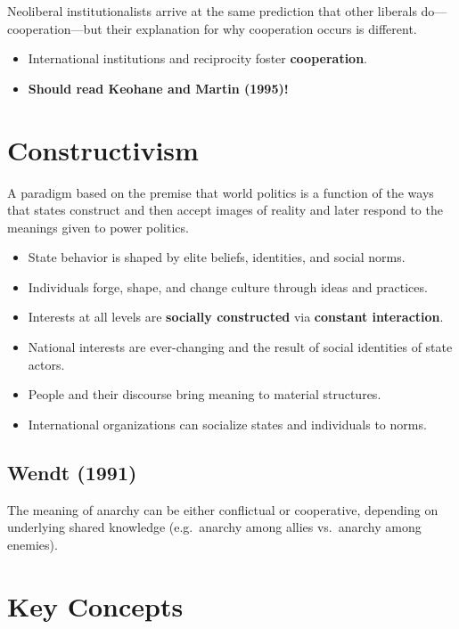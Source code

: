 \documentclass[
]{book}
\begin{document}
Neoliberal institutionalists arrive at the same prediction that other liberals do---cooperation---but their explanation for why cooperation occurs is different.

\begin{itemize}
\item
  International institutions and reciprocity foster \textbf{cooperation}.
\item
  \textbf{Should read Keohane and Martin (1995)!}
\end{itemize}

\hypertarget{constructivism}{%
\section{Constructivism}\label{constructivism}}

A paradigm based on the premise that world politics is a function of the ways that states construct and then accept images of reality and later respond to the meanings given to power politics.

\begin{itemize}
\item
  State behavior is shaped by elite beliefs, identities, and social norms.
\item
  Individuals forge, shape, and change culture through ideas and practices.
\item
  Interests at all levels are \textbf{socially constructed} via \textbf{constant interaction}.
\item
  National interests are ever-changing and the result of social identities of state actors.
\item
  People and their discourse bring meaning to material structures.
\item
  International organizations can socialize states and individuals to norms.
\end{itemize}

\hypertarget{wendt-1991}{%
\subsection{Wendt (1991)}\label{wendt-1991}}

The meaning of anarchy can be either conflictual or cooperative, depending on underlying shared knowledge (e.g.~anarchy among allies vs.~anarchy among enemies).

\hypertarget{key-concepts-1}{%
\section{Key Concepts}\label{key-concepts-1}}
\end{document}
